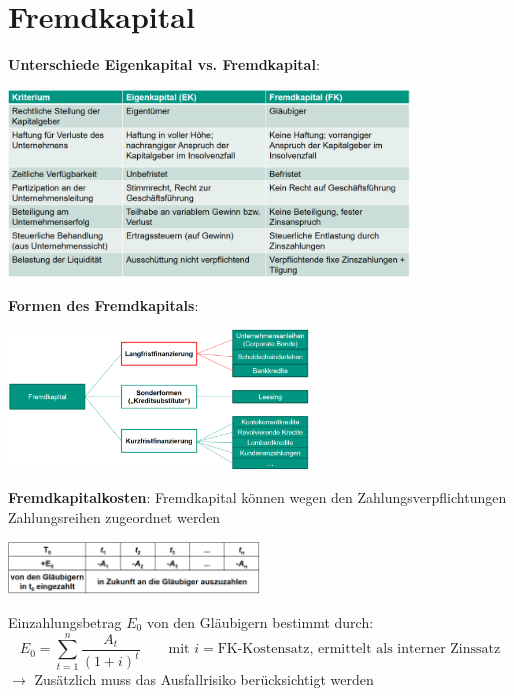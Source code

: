 \section{Fremdkapital}

\textbf{Unterschiede Eigenkapital vs. Fremdkapital}:
\begin{center}
	\includegraphics[width=0.8\textwidth]{images/ek-fk.png}
\end{center}

\textbf{Formen des Fremdkapitals}:
\begin{center}
	\includegraphics[width=0.6\textwidth]{images/formen-fk.png}
\end{center}

\textbf{Fremdkapitalkosten}: Fremdkapital können wegen den Zahlungsverpflichtungen Zahlungsreihen zugeordnet werden
\begin{center}
	\includegraphics[width=0.5\textwidth]{images/fk-zr.png}
\end{center}
Einzahlungsbetrag $E_0$ von den Gläubigern bestimmt durch:
$$E_0=\sum\limits_{t=1}^{n}\frac{A_t}{(1+i)^t}\qquad\text{mit }i=\text{FK-Kostensatz, ermittelt als interner Zinssatz}$$
$\rightarrow$ Zusätzlich muss das Ausfallrisiko berücksichtigt werden\\

